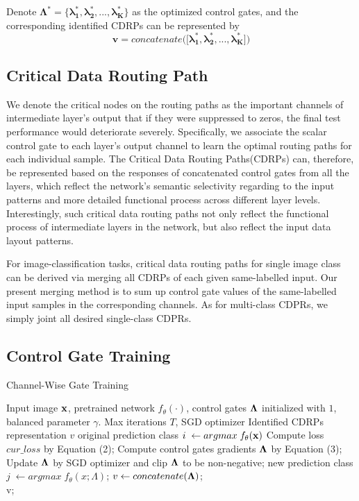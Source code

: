 \documentclass[conference]{IEEEtran}
\begin{document}
Denote $\bm{\Lambda ^*} = \{ \bm{\lambda_1^*, \lambda_2^*, ..., \lambda_K^*}\}$ as the optimized control gates, and the corresponding identified CDRPs can be represented by 
\begin{equation} 
	\bm{v = \textit{concatenate}([\lambda_1^*, \lambda_2^*, ..., \lambda_K^*}])
\end{equation}

\subsection{Critical Data Routing Path}

We denote the critical nodes on the routing paths as the important channels of intermediate layer’s output that if they were suppressed to zeros, the final test performance would deteriorate severely. Specifically, we associate the scalar control gate to each layer’s output channel to learn the optimal routing paths for each individual sample. The Critical Data Routing Paths(CDRPs) can, therefore, be represented based on the responses of concatenated control gates from all the layers, which reflect the network’s semantic selectivity regarding to the input patterns and more detailed functional process across different layer levels. Interestingly, such critical data routing paths not only reflect the functional process of intermediate layers in the network, but also reflect the input data layout patterns\cite{Wang_2018_CVPR}.

For image-classification tasks, critical data routing paths for single image class can be derived via merging all CDRPs of each given same-labelled input. Our present merging method is to sum up control gate values of the same-labelled input samples in the corresponding channels. As for multi-class CDPRs, we simply joint all desired single-class CDPRs.

\subsection{Control Gate Training}

\begin{algorithm}[htb!] 
	\caption{Channel-Wise Gate Training} 
	\label{alg:Framwork} 
	\begin{algorithmic}[1] 
		\Require 
			Input image $\bf x$, pretrained network $f_\theta(\cdot)$, control gates $\bf \Lambda$ initialized with $1$, balanced parameter $\gamma$. Max iterations $T$, SGD optimizer
		\Ensure 
			Identified CDRPs representation $v$
		\State original prediction class $i\; \leftarrow argmax \; f_{\theta}(\bf x)$  
		\State Compute loss $cur\_loss$ by Equation (2);
		\State Compute control gates gradients $\bf \Lambda$ by Equation (3); 
		\State Update $\bf \Lambda$ by SGD optimizer and clip $\bf \Lambda$ to be non-negative; 
		\State new prediction class $j\; \leftarrow argmax \; f_{\theta}(x;\Lambda)$;
				\State $v \leftarrow concatenate(\bf \Lambda)$;
			\EndIf
		\EndIf
		\EndFor\\
		\Return v;
	\end{algorithmic} 
\end{algorithm}
\end{document}
